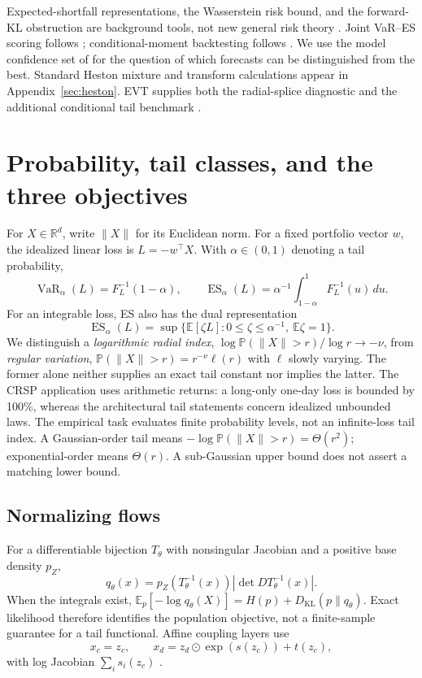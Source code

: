 \documentclass[11pt]{article}
\theoremstyle{definition}\newtheorem{definition}[theorem]{Definition}
\theoremstyle{remark}\newtheorem{remark}[theorem]{Remark}
\newcommand{\E}{\mathbb E}\newcommand{\Prob}{\mathbb P}\newcommand{\R}{\mathbb R}
\newcommand{\KL}{D_{\mathrm{KL}}}\newcommand{\ES}{\operatorname{ES}}\newcommand{\VaR}{\operatorname{VaR}}
\begin{document}
Expected-shortfall representations, the Wasserstein risk bound, and the forward-KL obstruction are background tools, not new general risk theory \citep{acerbi2002coherence,rockafellar2002cvar,esfahani2018}. Joint VaR--ES scoring follows \citet{fissler2016,patton2019}; conditional-moment backtesting follows \citet{nolde2017}. We use the model confidence set of \citet{hansen2011mcs} for the question of which forecasts can be distinguished from the best. Standard Heston mixture and transform calculations appear in Appendix~\ref{sec:heston}. EVT supplies both the radial-splice diagnostic and the additional conditional tail benchmark \citep{pickands1975,balkema1974,breiman1965,mcneil2000evt}.

\section{Probability, tail classes, and the three objectives}\label{sec:objectives}
For $X\in\R^d$, write $\|X\|$ for its Euclidean norm. For a fixed portfolio vector $w$, the idealized linear loss is $L=-w^\top X$. With $\alpha\in(0,1)$ denoting a tail probability,
\begin{equation}\label{eq:es}
\VaR_\alpha(L)=F_L^{-1}(1-\alpha),\qquad
\ES_\alpha(L)=\alpha^{-1}\int_{1-\alpha}^1F_L^{-1}(u)\,du.
\end{equation}
For an integrable loss, ES also has the dual representation
\begin{equation}\label{eq:dual}
\ES_\alpha(L)=\sup\{\E[\zeta L]:0\le\zeta\le\alpha^{-1},\ \E\zeta=1\}.
\end{equation}
We distinguish a \emph{logarithmic radial index},
$\log\Prob(\|X\|>r)/\log r\to-\nu$, from \emph{regular variation},
$\Prob(\|X\|>r)=r^{-\nu}\ell(r)$ with $\ell$ slowly varying. The former alone neither supplies an exact tail constant nor implies the latter. The CRSP application uses arithmetic returns: a long-only one-day loss is bounded by 100\%, whereas the architectural tail statements concern idealized unbounded laws. The empirical task evaluates finite probability levels, not an infinite-loss tail index. A Gaussian-order tail means $-\log\Prob(\|X\|>r)=\Theta(r^2)$; exponential-order means $\Theta(r)$. A sub-Gaussian upper bound does not assert a matching lower bound.

\subsection{Normalizing flows}
For a differentiable bijection $T_\theta$ with nonsingular Jacobian and a positive base density $p_Z$,
\begin{equation}\label{eq:flow-density}
q_\theta(x)=p_Z(T_\theta^{-1}(x))|\det DT_\theta^{-1}(x)|.
\end{equation}
When the integrals exist, $\E_p[-\log q_\theta(X)]=H(p)+\KL(p\|q_\theta)$. Exact likelihood therefore identifies the population objective, not a finite-sample guarantee for a tail functional. Affine coupling layers use
\begin{equation}\label{eq:coupling}
x_c=z_c,\qquad x_d=z_d\odot\exp(s(z_c))+t(z_c),
\end{equation}
with log Jacobian $\sum_i s_i(z_c)$ \citep{dinh2017realnvp}.
\end{document}
